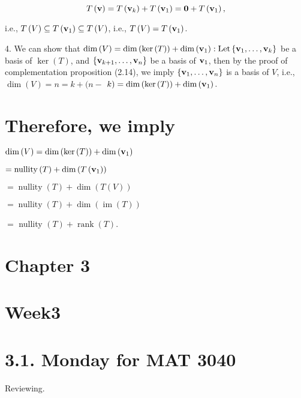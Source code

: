 \documentclass[11pt]{article}
\begin{document}
\[
T\left( \mathbf{v}\right)  = T\left( {\bf v}_{k}\right)  + T\left( {\bf v}_1\right)  = \mathbf{0} + T\left( {\bf v}_1\right) ,
\]

i.e., \(T\left( V\right)  \subseteq  T\left( {\bf v}_1\right)  \subseteq  T\left( V\right)\), i.e., \(T\left( V\right)  = T\left( {\bf v}_1\right)\).

4. We can show that \(\dim \left( V\right)  = \dim \left( {\ker \left( T\right) }\right)  + \dim \left( {\bf v}_1\right)  : \operatorname{Let}\left\{  {{\bf v}_1,\ldots ,{\bf v}_{k}}\right\}\) be a basis of \(\ker \left( T\right)\), and \(\left\{  {{\bf v}_{k + 1},\ldots ,{\bf v}_n}\right\}\) be a basis of \({\bf v}_1\), then by the proof of complementation proposition (2.14), we imply \(\left\{  {{\bf v}_1,\ldots ,{\bf v}_n}\right\}\) is a basis of \(V\), i.e., \(\dim \left( V\right)  = n = k + (n -\)  \(k) = \dim \left( {\ker \left( T\right) }\right)  + \dim \left( {\bf v}_1\right) .\)

\section*{Therefore, we imply}

\(\dim \left( V\right)  = \dim \left( {\ker \left( T\right) }\right)  + \dim \left( {\bf v}_1\right)\)

\(= \operatorname{nullity}\left( T\right)  + \dim \left( {T\left( {\bf v}_1\right) }\right)\)

\(= \operatorname{nullity}\left( T\right)  + \dim \left( {T\left( V\right) }\right)\)

\(= \operatorname{nullity}\left( T\right)  + \dim \left( {\operatorname{im}\left( T\right) }\right)\)

\(=\) nullity \(\left( T\right)  + \operatorname{rank}\left( T\right)\).

\section*{Chapter 3}

\section*{Week3}

\section*{3.1. Monday for MAT 3040}

Reviewing.
\end{document}
